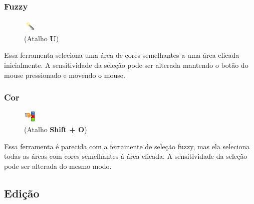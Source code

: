 \documentclass[12pt,onecolumn]{article}
\begin{document}
      \subsubsection{Fuzzy}
      \begin{figure}
        \vspace{-20pt}
        \begin{center}
          \includegraphics{gimp-icons/stock-tool-fuzzy-select-22.png} \\
          (Atalho {\bf U})
        \end{center}
        \label{fig:magicselect}
        \vspace{-20pt}
      \end{figure}
      Essa ferramenta seleciona uma área de cores semelhantes a uma área clicada inicialmente.
      A sensitividade da seleção pode ser alterada mantendo o botão do mouse pressionado e movendo
      o mouse.

      \subsubsection{Cor}
      \begin{figure}
        \vspace{-20pt}
        \begin{center}
          \includegraphics{gimp-icons/stock-tool-by-color-select-22.png} \\
          (Atalho {\bf Shift + O})
        \end{center}
        \label{fig:colorselect}
        \vspace{-20pt}
      \end{figure}
      Essa ferramenta é parecida com a ferramente de seleção fuzzy, mas ela seleciona todas as áreas
      com cores semelhantes à área clicada. A sensitividade da seleção pode ser alterada do mesmo
      modo.

  \subsection{Edição}
\end{document}
